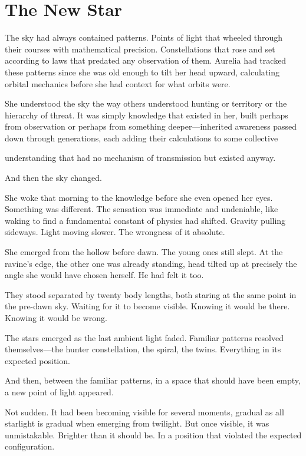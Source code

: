 \chapter{The New Star}
\label{ch:04}


The sky had always contained patterns. Points of light that wheeled through their courses with mathematical precision. Constellations that rose and set according to laws that predated any observation of them. Aurelia had tracked these patterns since she was old enough to tilt her head upward, calculating orbital mechanics before she had context for what orbits were.

She understood the sky the way others understood hunting or territory or the hierarchy of threat. It was simply knowledge that existed in her, built perhaps from observation or perhaps from something deeper—inherited awareness passed down through generations, each adding their calculations to some collective

understanding that had no mechanism of transmission but existed anyway.

And then the sky changed.

She woke that morning to the knowledge before she even opened her eyes. Something was different. The sensation was immediate and undeniable, like waking to find a fundamental constant of physics had shifted. Gravity pulling sideways. Light moving slower. The wrongness of it absolute.

She emerged from the hollow before dawn. The young ones still slept. At the ravine's edge, the other one was already standing, head tilted up at precisely the angle she would have chosen herself. He had felt it too.

They stood separated by twenty body lengths, both staring at the same point in the pre-dawn sky. Waiting for it to become visible. Knowing it would be there. Knowing it would be wrong.

The stars emerged as the last ambient light faded. Familiar patterns resolved themselves—the hunter constellation, the spiral, the twins. Everything in its expected position.

And then, between the familiar patterns, in a space that should have been empty, a new point of light appeared.

Not sudden. It had been becoming visible for several moments, gradual as all starlight is gradual when emerging from twilight. But once visible, it was unmistakable. Brighter than it should be. In a position that violated the expected configuration.

